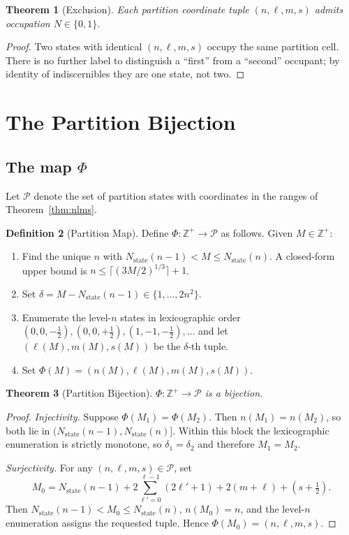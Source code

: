 \documentclass[twocolumn,10pt,a4paper]{article}
\theoremstyle{thmstyle}
\newtheorem{theorem}{Theorem}[section]
\theoremstyle{definition}
\newtheorem{definition}[theorem]{Definition}
\theoremstyle{remark}
\newcommand{\Zp}{\mathbb{Z}^{+}}
\newcommand{\Parts}{\mathcal{P}}
\newcommand{\PhiMap}{\varPhi}
\newcommand{\Nstate}{N_{\mathrm{state}}}
\begin{document}
\begin{theorem}[Exclusion]
\label{thm:excl}
Each partition coordinate tuple $(n,\ell,m,s)$ admits occupation
$N\in\{0,1\}$.
\end{theorem}

\begin{proof}
Two states with identical $(n,\ell,m,s)$ occupy the same partition
cell. There is no further label to distinguish a ``first'' from a
``second'' occupant; by identity of indiscernibles they are one state,
not two.
\end{proof}

\section{The Partition Bijection}
\label{sec:bijection}

\subsection{The map $\PhiMap$}

Let $\Parts$ denote the set of partition states with coordinates in
the ranges of Theorem~\ref{thm:nlms}.

\begin{definition}[Partition Map]
\label{def:phi}
Define $\PhiMap:\Zp\to\Parts$ as follows. Given $M\in\Zp$:
\begin{enumerate}[leftmargin=*,itemsep=0.1em]
\item Find the unique $n$ with $\Nstate(n-1)<M\leq\Nstate(n)$.
A closed-form upper bound is
$n\leq\bigl\lceil(3M/2)^{1/3}\bigr\rceil+1$.
\item Set $\delta=M-\Nstate(n-1)\in\{1,\ldots,2n^{2}\}$.
\item Enumerate the level-$n$ states in lexicographic order
$(0,0,-\tfrac{1}{2}),(0,0,+\tfrac{1}{2}),(1,-1,-\tfrac{1}{2}),\ldots$
and let $(\ell(M),m(M),s(M))$ be the $\delta$-th tuple.
\item Set $\PhiMap(M)=(n(M),\ell(M),m(M),s(M))$.
\end{enumerate}
\end{definition}

\begin{theorem}[Partition Bijection]
\label{thm:bij}
$\PhiMap:\Zp\to\Parts$ is a bijection.
\end{theorem}

\begin{proof}
\emph{Injectivity.} Suppose $\PhiMap(M_{1})=\PhiMap(M_{2})$. Then
$n(M_{1})=n(M_{2})$, so both lie in $(\Nstate(n-1),\Nstate(n)]$.
Within this block the lexicographic enumeration is strictly
monotone, so $\delta_{1}=\delta_{2}$ and therefore $M_{1}=M_{2}$.

\emph{Surjectivity.} For any $(n,\ell,m,s)\in\Parts$, set
\[
M_{0}=\Nstate(n-1)+2\sum_{\ell'=0}^{\ell-1}(2\ell'+1)+2(m+\ell)+(s+\tfrac{1}{2}).
\]
Then $\Nstate(n-1)<M_{0}\leq\Nstate(n)$, $n(M_{0})=n$, and the
level-$n$ enumeration assigns the requested tuple. Hence
$\PhiMap(M_{0})=(n,\ell,m,s)$.
\end{proof}
\end{document}
